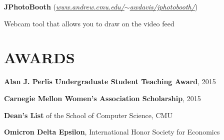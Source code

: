 \documentclass[margin, 11pt]{res} %
\begin{document}
\begin{resume}
\vspace{3pt}
{\bf JPhotoBooth} (\href{www.andrew.cmu.edu/~awdavis/jphotobooth/}{\sl www.andrew.cmu.edu/$\sim$awdavis/jphotobooth/})
\begin{itemize} \itemsep -2pt
{\small \item Webcam tool that allows you to draw on the video feed}
\end{itemize}



\section{AWARDS}

{\bf Alan J. Perlis Undergraduate Student Teaching Award}, 2015

\vspace{6pt}

{\bf Carnegie Mellon Women's Association Scholarship}, 2015

\vspace{6pt}

{\bf Dean's List} of the School of Computer Science, CMU

\vspace{6pt}

{\bf Omicron Delta Epsilon}, International Honor Society for Economics


\end{resume}
\end{document}
